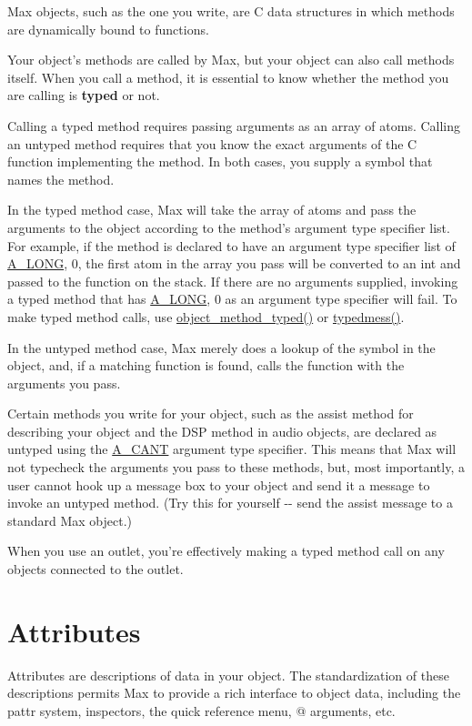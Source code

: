 Max objects, such as the one you write, are C data structures in which methods are dynamically bound to functions.

Your object's methods are called by Max, but your object can also call methods itself. When you call a method, it is essential to know whether the method you are calling is {\bfseries typed} or not.

Calling a typed method requires passing arguments as an array of atoms. Calling an untyped method requires that you know the exact arguments of the C function implementing the method. In both cases, you supply a symbol that names the method.

In the typed method case, Max will take the array of atoms and pass the arguments to the object according to the method's argument type specifier list. For example, if the method is declared to have an argument type specifier list of \hyperlink{group__atom_gga8aa6700e9f00b132eb376db6e39ade47a002f28879581a6f66ea492b994b96f1e}{A\_\-LONG}, 0, the first atom in the array you pass will be converted to an int and passed to the function on the stack. If there are no arguments supplied, invoking a typed method that has \hyperlink{group__atom_gga8aa6700e9f00b132eb376db6e39ade47a002f28879581a6f66ea492b994b96f1e}{A\_\-LONG}, 0 as an argument type specifier will fail. To make typed method calls, use \hyperlink{group__obj_ga443dee482af22e0fe83e68955d367226}{object\_\-method\_\-typed()} or \hyperlink{group__class__old_ga78c60eb0068bce55eaa635e206cba52e}{typedmess()}.

In the untyped method case, Max merely does a lookup of the symbol in the object, and, if a matching function is found, calls the function with the arguments you pass.

Certain methods you write for your object, such as the assist method for describing your object and the DSP method in audio objects, are declared as untyped using the \hyperlink{group__atom_gga8aa6700e9f00b132eb376db6e39ade47af48193ec36e53b1507d81c49873c8d7a}{A\_\-CANT} argument type specifier. This means that Max will not typecheck the arguments you pass to these methods, but, most importantly, a user cannot hook up a message box to your object and send it a message to invoke an untyped method. (Try this for yourself -\/-\/ send the assist message to a standard Max object.)

When you use an outlet, you're effectively making a typed method call on any objects connected to the outlet.\hypertarget{chapter_msgattached_chapter_msgattached_attrs}{}\section{Attributes}\label{chapter_msgattached_chapter_msgattached_attrs}
Attributes are descriptions of data in your object. The standardization of these descriptions permits Max to provide a rich interface to object data, including the pattr system, inspectors, the quick reference menu, @ arguments, etc.


